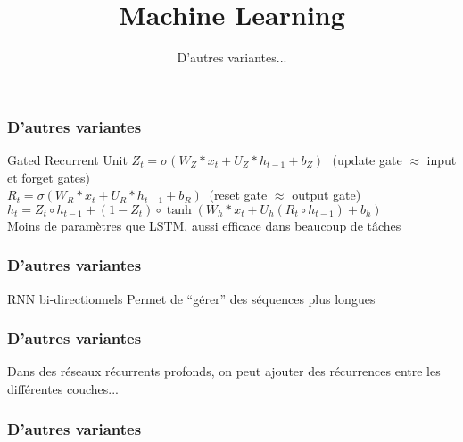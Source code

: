 \documentclass{formation}
\title{Machine Learning}
\subtitle{D'autres variantes...}
\begin{document}
\maketitle

\begin{frame}
  \frametitle{D'autres variantes}
  Gated Recurrent Unit
  $Z_{t}=\sigma (W_{Z}*x_{t}+U_{Z}*h_{t-1}+b_{Z})\,\,\,\,$(update gate $\approx$ input et forget gates) \\
  $R_{t}=\sigma (W_{R}*x_{t}+U_{R}*h_{t-1}+b_{R})\;\;$(reset gate $\approx$ output gate) \\
  $h_{t}=Z_{t}\circ h_{t-1}+(1-Z_{t})\circ \tanh(W_{h}*x_{t}+U_{h}(R_{t}\circ h_{t-1})+b_{h})$ \\
  Moins de paramètres que LSTM, aussi efficace dans beaucoup de tâches
\end{frame}

\begin{frame}
  \frametitle{D'autres variantes}
  RNN bi-directionnels
  Permet de ``gérer'' des séquences plus longues
\end{frame}

\begin{frame}
  \frametitle{D'autres variantes}
  Dans des réseaux récurrents profonds, on peut ajouter des récurrences entre les différentes couches... \\
\end{frame}

\begin{frame}
  \frametitle{D'autres variantes}
\end{frame}
\end{document}
